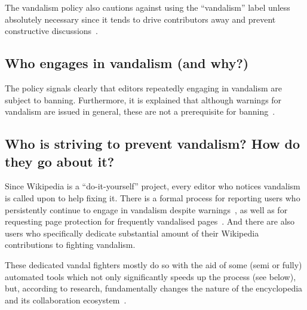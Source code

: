 The vandalism policy also cautions against using the ``vandalism'' label unless absolutely necessary since it tends to drive contributors away and prevent constructive discussions~\cite{Wikipedia:Vandalism}.

\begin{comment}
\url{https://en.wikipedia.org/wiki/Wikipedia:Vandalism}
"Careful consideration may be required to differentiate between edits that are beneficial, edits that are detrimental but well-intentioned, and edits that are vandalism."

\url{https://en.wikipedia.org/wiki/Wikipedia:Disruptive_editing}

"Disruptive editing is not always intentional. Editors may be accidentally disruptive because they don't understand how to correctly edit, or because they lack the social skills or competence necessary to work collaboratively "
Okay what are disruptive edits that are not vandalism? (apart from edit wars)

"Engages in "disruptive cite-tagging"; adds unjustified {{citation needed}} tags to an article when the content tagged is already sourced, uses such tags to suggest that properly sourced article content is questionable."
\end{comment}

\subsection{Who engages in vandalism (and why?)}

The policy signals clearly that editors repeatedly engaging in vandalism are subject to banning.
Furthermore, it is explained that although warnings for vandalism are issued in general, these are not a prerequisite for banning~\cite{Wikipedia:Vandalism}.

\subsection{Who is striving to prevent vandalism? How do they go about it?}

Since Wikipedia is a ``do-it-yourself'' project, every editor who notices vandalism is called upon to help fixing it.
There is a formal process for reporting users who persistently continue to engage in vandalism despite warnings~\cite{Wikipedia:AIV}, %
as well as for requesting page protection for frequently vandalised pages~\cite{Wikipedia:PageProtection}.
And there are also users who specifically dedicate substantial amount of their Wikipedia contributions to fighting vandalism.

These dedicated vandal fighters mostly do so with the aid of some (semi or fully) automated tools which not only significantly speeds up the process (see below),
but, according to research, fundamentally changes the nature of the encyclopedia and its collaboration ecosystem~\cite{GeiRib2010}.

